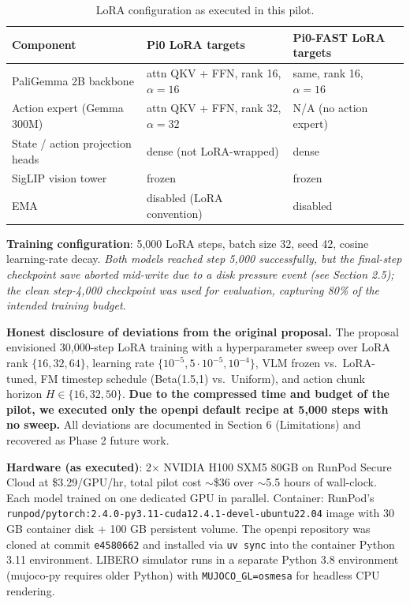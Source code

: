 \documentclass[11pt,letterpaper]{article}
\begin{document}
\begin{table}[h]
\centering
\small
\caption{LoRA configuration as executed in this pilot.}
\begin{tabular}{lll}
\toprule
\textbf{Component} & \textbf{Pi0 LoRA targets} & \textbf{Pi0-FAST LoRA targets} \\
\midrule
PaliGemma 2B backbone & attn QKV + FFN, rank 16, $\alpha=16$ & same, rank 16, $\alpha=16$ \\
Action expert (Gemma 300M) & attn QKV + FFN, rank 32, $\alpha=32$ & N/A (no action expert) \\
State / action projection heads & dense (not LoRA-wrapped) & dense \\
SigLIP vision tower & frozen & frozen \\
EMA & disabled (LoRA convention) & disabled \\
\bottomrule
\end{tabular}
\end{table}

\textbf{Training configuration}: 5{,}000 LoRA steps, batch size 32, seed 42, cosine learning-rate decay. \emph{Both models reached step 5{,}000 successfully, but the final-step checkpoint save aborted mid-write due to a disk pressure event (see Section 2.5); the clean step-4{,}000 checkpoint was used for evaluation, capturing 80\% of the intended training budget.}

\begin{callout}
\textbf{Honest disclosure of deviations from the original proposal.} The proposal envisioned 30{,}000-step LoRA training with a hyperparameter sweep over LoRA rank $\{16, 32, 64\}$, learning rate $\{10^{-5}, 5\!\cdot\!10^{-5}, 10^{-4}\}$, VLM frozen vs.\ LoRA-tuned, FM timestep schedule (Beta(1.5,1) vs.\ Uniform), and action chunk horizon $H \in \{16, 32, 50\}$. \textbf{Due to the compressed time and budget of the pilot, we executed only the openpi default recipe at 5{,}000 steps with no sweep.} All deviations are documented in Section 6 (Limitations) and recovered as Phase 2 future work.
\end{callout}

\textbf{Hardware (as executed)}: 2$\times$ NVIDIA H100 SXM5 80GB on RunPod Secure Cloud at \$3.29/GPU/hr, total pilot cost $\sim$\$36 over $\sim$5.5 hours of wall-clock. Each model trained on one dedicated GPU in parallel. Container: RunPod's \texttt{runpod/pytorch:2.4.0-py3.11-cuda12.4.1-devel-ubuntu22.04} image with 30 GB container disk + 100 GB persistent volume. The openpi repository was cloned at commit \texttt{e4580662} and installed via \texttt{uv sync} into the container Python 3.11 environment. LIBERO simulator runs in a separate Python 3.8 environment (mujoco-py requires older Python) with \texttt{MUJOCO\_GL=osmesa} for headless CPU rendering.
\end{document}
